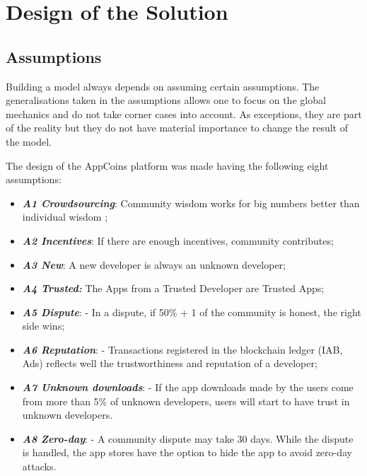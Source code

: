 \section{Design of the Solution}

\label{sec:design}

\subsection{Assumptions}


Building a model always depends on assuming certain assumptions. The generalisations taken in the 
assumptions allows one to focus on the global mechanics and do not take corner cases into account. 
As exceptions, they are part of the reality but they do not have material importance to change the result 
of the model.

The design of the AppCoins platform was made having the following eight assumptions:

\begin{itemize}
\item {\bf\em A1 Crowdsourcing}: Community wisdom works for big numbers better than individual 
wisdom \cite{Surowiecki:2005:WC:1095645};
\item {\bf\em A2 Incentives}: If there are enough incentives, community contributes;
\item {\bf\em A3 New}: A new developer is always an unknown developer;
\item {\bf\em A4 Trusted:} The Apps from a Trusted Developer are Trusted Apps;
\item {\bf\em A5 Dispute}: - In a dispute, if 50\% + 1 of the community is honest, the right side wins;
\item {\bf\em A6 Reputation}: - Transactions registered in the blockchain ledger (IAB, Ads) reflects well 
the trustworthiness and reputation of a developer;
\item {\bf\em A7 Unknown downloads}: - If the app downloads made by the users come from more than 
5\% of unknown developers, users will start to have trust in unknown developers.
\item {\bf\em A8 Zero-day}: - A community dispute may take 30 days. While the dispute is handled, the 
app stores have the option to hide the app to avoid zero-day attacks.
\end{itemize}



